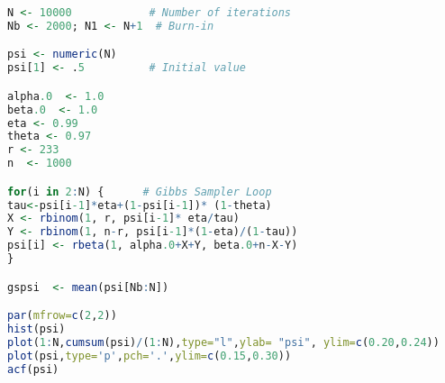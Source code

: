 \begin{description}

\begin{lstlisting}[language=R]
N <- 10000            # Number of iterations
Nb <- 2000; N1 <- N+1  # Burn-in

psi <- numeric(N) 
psi[1] <- .5          # Initial value

alpha.0  <- 1.0
beta.0  <- 1.0
eta <- 0.99
theta <- 0.97
r <- 233
n  <- 1000

for(i in 2:N) {      # Gibbs Sampler Loop
tau<-psi[i-1]*eta+(1-psi[i-1])* (1-theta)        
X <- rbinom(1, r, psi[i-1]* eta/tau)
Y <- rbinom(1, n-r, psi[i-1]*(1-eta)/(1-tau))
psi[i] <- rbeta(1, alpha.0+X+Y, beta.0+n-X-Y)
}

gspsi  <- mean(psi[Nb:N])

par(mfrow=c(2,2))
hist(psi)
plot(1:N,cumsum(psi)/(1:N),type="l",ylab= "psi", ylim=c(0.20,0.24))
plot(psi,type='p',pch='.',ylim=c(0.15,0.30))
acf(psi)
\end{lstlisting}













\end{description}



